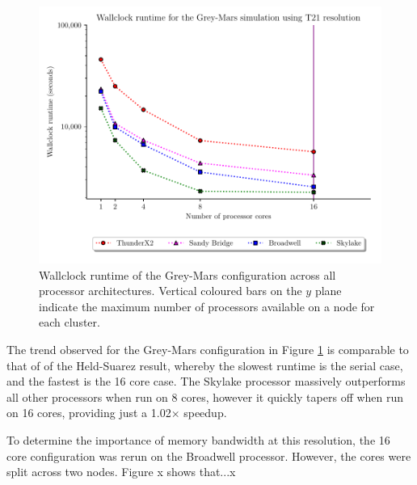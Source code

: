 \documentclass[a4paper,11pt]{report}
\begin{document}
\begin{figure}[htbp]
\begin{center}
\includegraphics[width=0.8\linewidth]{img/scaling_graph_T21_Grey_mars.pdf}
\caption{Wallclock runtime of the Grey-Mars configuration across all processor architectures. Vertical coloured bars on the $y$ plane indicate the maximum number of processors available on a node for each cluster.}
\label{fig:t21-scale-grey}
\end{center}
\end{figure}
\par
The trend observed for the Grey-Mars configuration in Figure \ref{fig:t21-scale-grey} is comparable to that of of the Held-Suarez result, whereby the slowest runtime is the serial case, and the fastest is the 16 core case. The Skylake processor massively outperforms all other processors when run on 8 cores, however it quickly tapers off when run on 16 cores, providing just a 1.02$\times$ speedup. 
\par
To determine the importance of memory bandwidth at this resolution, the 16 core configuration was rerun on the Broadwell processor. However, the cores were split across two nodes. Figure x shows that...x
\end{document}
